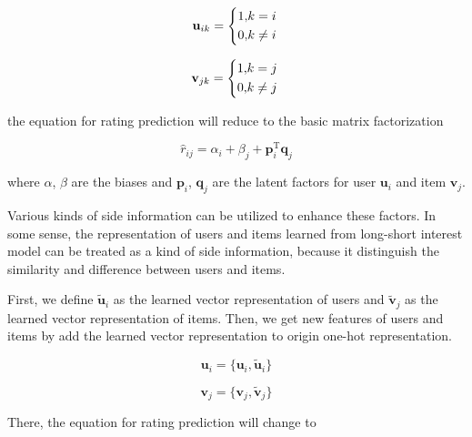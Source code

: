 \documentclass{sig-alternate-05-2015}
\begin{document}
\begin{equation}
    \mathbf{u}_{ik} =
    \left\{
        \begin{aligned}
            1, &k = i \\
            0, &k \not= i
        \end{aligned}
    \right. \\
\end{equation}

\begin{equation}
    \mathbf{v}_{jk} =
    \left\{
        \begin{aligned}
            1, &k = j \\
            0, &k \not= j
        \end{aligned}
    \right. \\
\end{equation}

the equation for rating prediction will reduce to the basic matrix factorization

\begin{equation}
\hat{r}_{ij} = \alpha_i + \beta_j + \mathbf{p}_i ^ \mathrm{T} \mathbf{q}_j
\end{equation}

where $\alpha$, $\beta$ are the biases and $\mathbf{p}_i$, $\mathbf{q}_j$
are the latent factors for user $\mathbf{u}_i$ and item $\mathbf{v}_j$.

Various kinds of side information can be utilized to enhance these factors.
In some sense, the representation of users and items
learned from long-short interest model can be treated as a kind of side information,
because it distinguish the similarity and difference between users and items.

First, we define $\tilde{\mathbf{u}}_i$ as
the learned vector representation of users and $\tilde{\mathbf{v}}_j$ as
the learned vector representation of items.
Then, we get new features of users and items by add the learned vector representation
to origin one-hot representation.

\begin{equation}
    \mathbf{u}_{i} = \{ \mathbf{u}_{i} , \tilde{\mathbf{u}}_i \}
\end{equation}

\begin{equation}
    \mathbf{v}_{j} = \{ \mathbf{v}_{j} , \tilde{\mathbf{v}}_j \}
\end{equation}

There, the equation for rating prediction will change to
\end{document}
